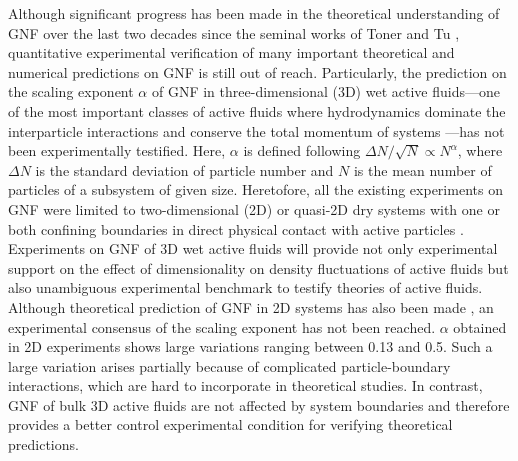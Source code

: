 \documentclass[twocolumn,aps,prl,amsmath,amssymb,longbibliography]{revtex4-2}
\begin{document}
Although significant progress has been made in the theoretical understanding of GNF over the last two decades since the seminal works of Toner and Tu
\cite{Toner1995, Tu1998, Toner1998,AditiSimha2002,Ramaswamy2003,Toner2005,Chate2008,Mishra2010,Dey2012,Vicsek2012,Saintillan2012,Saintillan2013,Ngo2014,Mahault2019}, quantitative experimental verification of many important theoretical and numerical predictions on GNF is still out of reach. Particularly, the prediction on the scaling exponent $\alpha$ of GNF in three-dimensional (3D) wet active fluids---one of the most important classes of active fluids where hydrodynamics dominate the interparticle interactions and conserve the total momentum of systems \cite{Marchetti2013}---has not been experimentally testified. Here, $\alpha$ is defined following $\Delta N /\sqrt N \propto N^\alpha$, where $\Delta N$ is the standard deviation of particle number and $N$ is the mean number of particles of a subsystem of given size. Heretofore, all the existing experiments on GNF were limited to two-dimensional (2D) or quasi-2D dry systems with one or both confining boundaries in direct physical contact with active particles \cite{Narayan2007, Aranson2008, Deseigne2010, Zhang2010, Schaller2013, Nishiguchi2017, Kawaguchi2017, Palacci2013}. Experiments on GNF of 3D wet active fluids will provide not only experimental support on the effect of dimensionality on density fluctuations of active fluids \cite{Marchetti2013} but also unambiguous experimental benchmark to testify theories of active fluids. Although theoretical prediction of GNF in 2D systems has also been made \cite{Toner1995,Toner2005}, an experimental consensus of the scaling exponent has not been reached. $\alpha$ obtained in 2D experiments shows large variations ranging between 0.13 and 0.5. Such a large variation arises partially because of complicated particle-boundary interactions, which are hard to incorporate in theoretical studies. In contrast, GNF of bulk 3D active fluids are not affected by system boundaries and therefore provides a better control experimental condition for verifying theoretical predictions.
\end{document}
